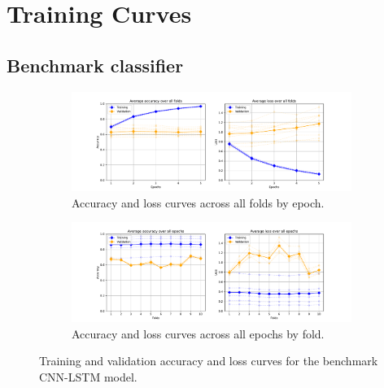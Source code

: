 \chapter{Training Curves}\label{app:curves}



\section{Benchmark classifier}\label{curves:benchmark}

\begin{figure}[htbp]
    \centering
    \begin{subfigure}[htbp]{\textwidth}
        \centering
        \includegraphics[trim={3cm 0 3cm 0.8cm},clip,width=\textwidth]{img/ch3/baseline_results/cnn_lstm_by_epoch.pdf}
        \caption{Accuracy and loss curves across all folds by epoch.}
        \label{fig:baseline-by-epoch}
    \end{subfigure}
    
    \vspace{0.5cm}
    
    \begin{subfigure}[htbp]{\textwidth}
        \centering
        \includegraphics[trim={3cm 0 3cm 0.8cm},clip,width=\textwidth]{img/ch3/baseline_results/cnn_lstm_by_fold.pdf}
        \caption{Accuracy and loss curves across all epochs by fold.}
        \label{fig:baseline-by-fold}
    \end{subfigure}
    \caption{Training and validation accuracy and loss curves for the benchmark CNN-LSTM model.}
    \label{fig:baseline-acc-loss}
\end{figure}


